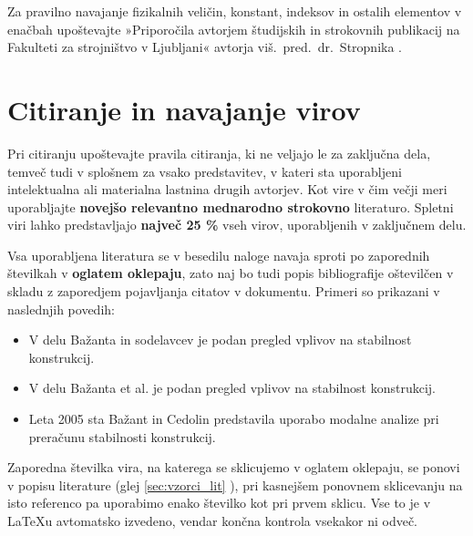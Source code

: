 Za pravilno navajanje fizikalnih veličin, konstant, indeksov in ostalih elementov v enačbah upoštevajte »Priporočila avtorjem študijskih in strokovnih publikacij na Fakulteti za strojništvo v Ljubljani« avtorja viš.~pred.~dr.~Stropnika \cite{stropnik_1997}.

\section{Citiranje in navajanje virov}\label{sec:citiranje}

Pri citiranju upoštevajte pravila citiranja, ki ne veljajo le za zaključna dela, temveč tudi v splošnem za vsako predstavitev, v kateri sta uporabljeni intelektualna ali materialna lastnina drugih avtorjev. Kot vire v čim večji meri uporabljajte \textbf{novejšo relevantno mednarodno strokovno} literaturo. Spletni viri lahko predstavljajo \textbf{največ 25 \%} vseh virov, uporabljenih v zaključnem delu.

Vsa uporabljena literatura se v besedilu naloge navaja sproti po zaporednih številkah v \textbf{oglatem oklepaju}, zato naj bo tudi popis bibliografije oštevilčen v skladu z zaporedjem pojavljanja citatov v dokumentu. Primeri so prikazani v naslednjih povedih:
\begin{itemize}
\item V delu Bažanta in sodelavcev \cite{bazant_1991} je podan pregled vplivov na stabilnost konstrukcij.
\item V delu Bažanta et al. \cite{bazant_1991} je podan pregled vplivov na stabilnost konstrukcij.
\item Leta 2005 sta Bažant in Cedolin \cite{bazant_1991} predstavila uporabo modalne analize pri pre\-ra\-ču\-nu stabilnosti konstrukcij.
\end{itemize}

Zaporedna številka vira, na katerega se sklicujemo v oglatem oklepaju, se ponovi v popisu literature (glej \ref{sec:vzorci_lit} ), pri kasnejšem ponovnem sklicevanju na isto referenco pa uporabimo enako številko kot pri prvem sklicu. Vse to je v \LaTeX u avtomatsko izvedeno, vendar končna kontrola vsekakor ni odveč.

